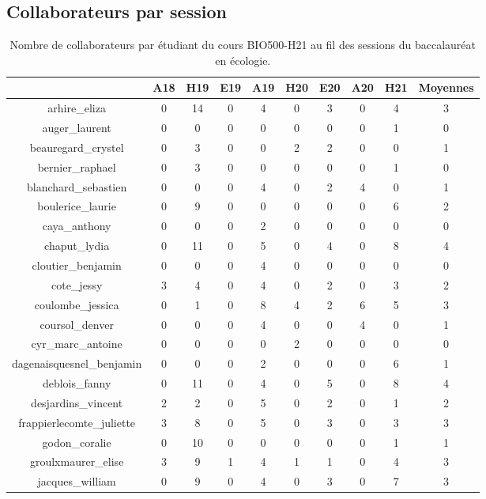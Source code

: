 \documentclass[12pt]{article}
\begin{document}
\subsection{Collaborateurs par session}
 \begin{table}[H]
 \centering
 \caption{Nombre de collaborateurs par étudiant du cours BIO500-H21 au fil des sessions du baccalauréat en écologie.\\} 
\begin{tabular}{|ccccccccc|c|}
\hline
& A18 & H19 & E19& A19 & H20 & E20 & A20 & H21 & \textbf{Moyennes} \\ 
\hline\hline 
arhire\_eliza & 0 & 14 & 0 & 4 & 0 & 3 & 0 & 4 & 3 \\ 
  auger\_laurent & 0 & 0 & 0 & 0 & 0 & 0 & 0 & 1 & 0 \\ 
  beauregard\_crystel & 0 & 3 & 0 & 0 & 2 & 2 & 0 & 0 & 1 \\ 
  bernier\_raphael & 0 & 3 & 0 & 0 & 0 & 0 & 0 & 1 & 0 \\ 
  blanchard\_sebastien & 0 & 0 & 0 & 4 & 0 & 2 & 4 & 0 & 1 \\ 
  boulerice\_laurie & 0 & 9 & 0 & 0 & 0 & 0 & 0 & 6 & 2 \\ 
  caya\_anthony & 0 & 0 & 0 & 2 & 0 & 0 & 0 & 0 & 0 \\ 
  chaput\_lydia & 0 & 11 & 0 & 5 & 0 & 4 & 0 & 8 & 4 \\ 
  cloutier\_benjamin & 0 & 0 & 0 & 4 & 0 & 0 & 0 & 0 & 0 \\ 
  cote\_jessy & 3 & 4 & 0 & 4 & 0 & 2 & 0 & 3 & 2 \\ 
  coulombe\_jessica & 0 & 1 & 0 & 8 & 4 & 2 & 6 & 5 & 3 \\ 
  coursol\_denver & 0 & 0 & 0 & 4 & 0 & 0 & 4 & 0 & 1 \\ 
  cyr\_marc\_antoine & 0 & 0 & 0 & 0 & 2 & 0 & 0 & 0 & 0 \\ 
  dagenaisquesnel\_benjamin & 0 & 0 & 0 & 2 & 0 & 0 & 0 & 6 & 1 \\ 
  deblois\_fanny & 0 & 11 & 0 & 4 & 0 & 5 & 0 & 8 & 4 \\ 
  desjardins\_vincent & 2 & 2 & 0 & 5 & 0 & 2 & 0 & 1 & 2 \\ 
  frappierlecomte\_juliette & 3 & 8 & 0 & 5 & 0 & 3 & 0 & 3 & 3 \\ 
  godon\_coralie & 0 & 10 & 0 & 0 & 0 & 0 & 0 & 1 & 1 \\ 
  groulxmaurer\_elise & 3 & 9 & 1 & 4 & 1 & 1 & 0 & 4 & 3 \\ 
  jacques\_william & 0 & 9 & 0 & 4 & 0 & 3 & 0 & 7 & 3 \\ 

\end{tabular}
\end{table}
\end{document}
